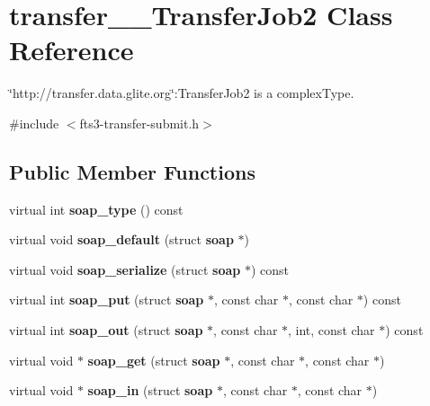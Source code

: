 \section{transfer\_\-\_\-TransferJob2 Class Reference}
\label{classtransfer____TransferJob2}


\char`\"{}http://transfer.data.glite.org\char`\"{}:TransferJob2 is a complexType.  




{\ttfamily \#include $<$fts3-\/transfer-\/submit.h$>$}

\subsection*{Public Member Functions}
\begin{DoxyCompactItemize}
\item 
virtual int {\bfseries soap\_\-type} () const \label{classtransfer____TransferJob2_a6f5b4aa33457e66ab9025d099e723096}

\item 
virtual void {\bfseries soap\_\-default} (struct {\bf soap} $\ast$)\label{classtransfer____TransferJob2_aacf858392122a8abf7f0df46c302c2cc}

\item 
virtual void {\bfseries soap\_\-serialize} (struct {\bf soap} $\ast$) const \label{classtransfer____TransferJob2_a9c10cc00f42ceecdd4d0fb4b8d7416f9}

\item 
virtual int {\bfseries soap\_\-put} (struct {\bf soap} $\ast$, const char $\ast$, const char $\ast$) const \label{classtransfer____TransferJob2_aa413088ea904a64134c77d5fc16b432a}

\item 
virtual int {\bfseries soap\_\-out} (struct {\bf soap} $\ast$, const char $\ast$, int, const char $\ast$) const \label{classtransfer____TransferJob2_a0d9f041e802b1dad61e406733c63ac53}

\item 
virtual void $\ast$ {\bfseries soap\_\-get} (struct {\bf soap} $\ast$, const char $\ast$, const char $\ast$)\label{classtransfer____TransferJob2_a7a0249083583867b341d8ff46fcc0da8}

\item 
virtual void $\ast$ {\bfseries soap\_\-in} (struct {\bf soap} $\ast$, const char $\ast$, const char $\ast$)\label{classtransfer____TransferJob2_a8eac1aa3fa0e5a7cf3823175ced31e07}

\end{DoxyCompactItemize}
